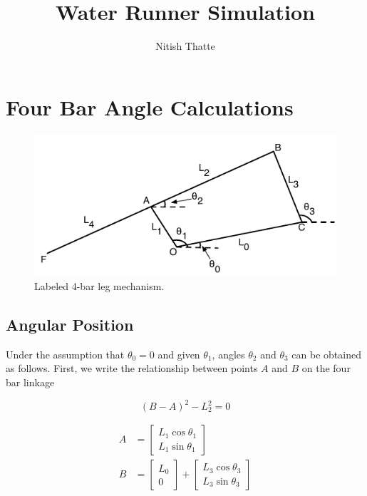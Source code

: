 \documentclass[letterpaper]{article}
\title{Water Runner Simulation}
\author{Nitish Thatte}
\begin{document}
\maketitle

\section{Four Bar Angle Calculations}

\begin{figure}[htb]
	\centering
	\includegraphics{4bar.pdf}
	\caption{Labeled 4-bar leg mechanism.}
	\label{fig:4bar}
\end{figure}

\subsection{Angular Position}
Under the assumption that $\theta_0 = 0$ and given $\theta_1$, angles $\theta_2$ and $\theta_3$ can be obtained as follows. First, we write the relationship between points $A$ and $B$ on the four bar linkage

\begin{equation}
	(B - A)^2 - L_2^2 = 0
	\label{eq:BArel}
\end{equation}

\begin{align}
	A &= \begin{bmatrix} L_1 \cos \theta_1 \\ L_1 \sin \theta_1 \end{bmatrix} \label{eq:Aloc}\\
	B &= \begin{bmatrix} L_0 \\ 0 \end{bmatrix} + \begin{bmatrix} L_3 \cos \theta_3 \\ L_3 \sin \theta_3 \end{bmatrix} \label{eq:Bloc}
\end{align}
\end{document}
